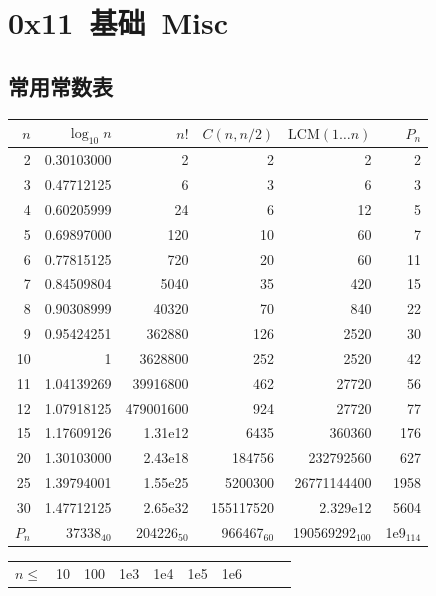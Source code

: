 \section{0x11\ 基础\ Misc}
\label{sec:0x11}

\subsection{常用常数表}

\begin{table}[H]
	\centering
	\small
	\renewcommand\arraystretch{0.8}
	\begin{tabular}{|r|r|r|r|r|r|}
		\hline
		\rowcolor{black!10} $n$ & $\log_{10} n$ & $n!$ & $C(n,n/2)$ & $\mathrm{LCM}(1\dots n)$ & $P_n$\\
		\hline
		2 & 0.30103000 & 2 & 2 & 2 & 2\\
		\hline
		3 & 0.47712125 & 6 & 3 & 6 & 3\\
		\hline
		4 & 0.60205999 & 24 & 6 & 12 & 5\\
		\hline
		5 & 0.69897000 & 120 & 10 & 60 & 7\\
		\hline
		6 & 0.77815125 & 720 & 20 & 60 & 11\\
		\hline
		7 & 0.84509804 & 5040 & 35 & 420 & 15\\
		\hline
		8 & 0.90308999 & 40320 & 70 & 840 & 22\\
		\hline
		9 & 0.95424251 & 362880 & 126 & 2520 & 30\\
		\hline
		10 & 1 & 3628800 & 252 & 2520 & 42\\
		\hline
		11 & 1.04139269 & 39916800 & 462  & 27720 & 56\\
		\hline
		12 & 1.07918125 & 479001600 & 924 & 27720 & 77\\
		\hline
		15 & 1.17609126 & 1.31e{12} & 6435 & 360360 & 176\\
		\hline
		20 & 1.30103000 & 2.43e{18} & 184756 & 232792560 & 627\\
		\hline
		25 & 1.39794001 & 1.55e{25} & 5200300 & 26771144400 & 1958\\
		\hline
		30 & 1.47712125 & 2.65e{32} & 155117520 & 2.329e{12} & 5604\\
		\hline
		$P_n$ & 37338$_{40}$ & 204226$_{50}$ & 966467$_{60}$ & 190569292$_{100}$ & 1e{9}$_{114}$\\
		\hline
	\end{tabular}
	\begin{tabular}{|c|c|c|c|c|c|c|c|c|c|}
		\hline
		\rowcolor{black!10} $n \leq$ & 10 &  100 & 1e3 & 1e4 & 1e5 & 1e6 \\

\end{tabular}
\end{table}
